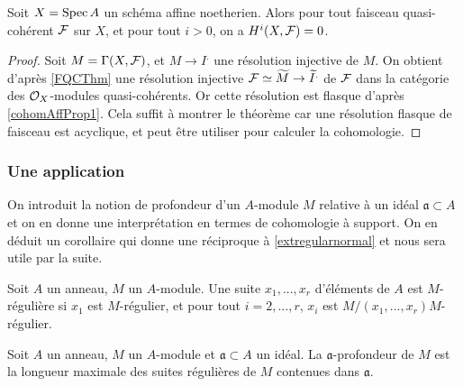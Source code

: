 \begin{thm}\label{cohomoaffine}
Soit $X=\operatorname{Spec} A$ un schéma affine noetherien. Alors pour tout faisceau quasi-cohérent $\mathcal{F}$ sur $X$, et pour tout $i>0$, on a $H^i(X,\mathcal{F})=0$. 
\end{thm}
\begin{proof}
Soit $M=\Gamma(X,\mathcal{F})$, et $M\rightarrow I^.$ une résolution injective de $M$. On obtient d'après \ref{FQCThm} une résolution injective $\mathcal{F}\simeq \widetilde{M}\rightarrow \widetilde{I}^.$ de $\mathcal{F}$ dans la catégorie des $\mathcal{O}_X$-modules quasi-cohérents. Or cette résolution est flasque d'après \ref{cohomAffProp1}. Cela suffit à montrer le théorème car une résolution flasque de faisceau est acyclique, et peut être utiliser pour calculer la cohomologie.
\end{proof}

\subsubsection{Une application}

On introduit la notion de profondeur d'un $A$-module $M$ relative à un idéal $\mathfrak{a}\subset A$ et on en donne une interprétation en termes de cohomologie à support. On en déduit un corollaire qui donne une réciproque à \ref{extregularnormal} et nous sera utile par la suite.

\begin{defn}
Soit $A$ un anneau, $M$ un $A$-module. Une suite $x_1,...,x_r$ d'éléments de $A$ est $M$-régulière si $x_1$ est $M$-régulier, et pour tout $i=2,...,r$, $x_i$ est $M/(x_1,...,x_r)M$-régulier.
\end{defn}

\begin{defn}[Profondeur]
Soit $A$ un anneau, $M$ un $A$-module et $\mathfrak{a}\subset A$ un idéal. La $\mathfrak{a}$-profondeur de $M$ est la longueur maximale des suites régulières de $M$ contenues dans $\mathfrak{a}$.
\end{defn}

